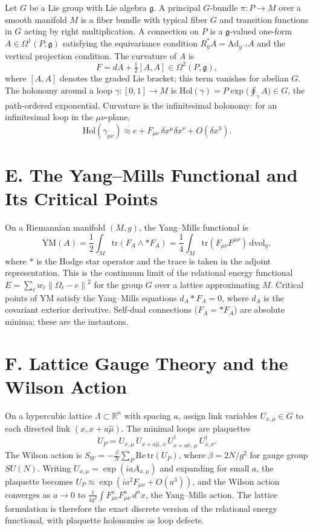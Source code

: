 \documentclass[12pt,a4paper,openany]{book}
\theoremstyle{plain}
\theoremstyle{definition}
\theoremstyle{remark}
\newcommand{\Energy}{E}
\newcommand{\norm}[1]{\left\|#1\right\|}
\begin{document}
Let $G$ be a Lie group with Lie algebra $\mathfrak{g}$. A principal $G$-bundle $\pi : P \to M$ over a smooth manifold $M$ is a fiber bundle with typical fiber $G$ and transition functions in $G$ acting by right multiplication. A connection on $P$ is a $\mathfrak{g}$-valued one-form $A \in \Omega^1(P, \mathfrak{g})$ satisfying the equivariance condition $R_g^* A = \mathrm{Ad}_{g^{-1}} A$ and the vertical projection condition. The curvature of $A$ is
\[
F = dA + \tfrac{1}{2}[A, A] \in \Omega^2(P, \mathfrak{g}),
\]
where $[A, A]$ denotes the graded Lie bracket; this term vanishes for abelian $G$. The holonomy around a loop $\gamma : [0,1] \to M$ is $\mathrm{Hol}(\gamma) = P\exp\!\bigl(\oint_\gamma A\bigr) \in G$, the path-ordered exponential. Curvature is the infinitesimal holonomy: for an infinitesimal loop in the $\mu\nu$-plane,
\[
\mathrm{Hol}(\gamma_{\mu\nu}) \approx e + F_{\mu\nu} \, \delta x^\mu \delta x^\nu + O(\delta x^3).
\]

\section*{E. The Yang--Mills Functional and Its Critical Points}

On a Riemannian manifold $(M, g)$, the Yang--Mills functional is
\[
\mathrm{YM}(A) = \frac{1}{2} \int_M \mathrm{tr}(F_A \wedge {*} F_A) = \frac{1}{4} \int_M \mathrm{tr}(F_{\mu\nu} F^{\mu\nu}) \, \mathrm{dvol}_g,
\]
where ${*}$ is the Hodge star operator and the trace is taken in the adjoint representation. This is the continuum limit of the relational energy functional $\Energy = \sum_\ell w_\ell \norm{\Omega_\ell - e}^2$ for the group $G$ over a lattice approximating $M$. Critical points of $\mathrm{YM}$ satisfy the Yang--Mills equations $d_A {*} F_A = 0$, where $d_A$ is the covariant exterior derivative. Self-dual connections ($F_A = {*} F_A$) are absolute minima; these are the instantons.

\section*{F. Lattice Gauge Theory and the Wilson Action}

On a hypercubic lattice $\Lambda \subset \mathbb{R}^n$ with spacing $a$, assign link variables $U_{x,\mu} \in G$ to each directed link $(x, x + a\hat\mu)$. The minimal loops are plaquettes
\[
U_P = U_{x,\mu} \, U_{x + a\hat\mu,\, \nu} \, U_{x + a\hat\nu,\, \mu}^\dagger \, U_{x,\nu}^\dagger.
\]
The Wilson action \cite{WilsonLattice1974} is $S_W = -\frac{\beta}{N} \sum_P \mathrm{Re}\, \mathrm{tr}(U_P)$, where $\beta = 2N/g^2$ for gauge group $SU(N)$. Writing $U_{x,\mu} = \exp(i a A_{x,\mu})$ and expanding for small $a$, the plaquette becomes $U_P \approx \exp(i a^2 F_{\mu\nu} + O(a^3))$, and the Wilson action converges as $a \to 0$ to $\frac{1}{4g^2} \int F_{\mu\nu}^a F_{\mu\nu}^a \, d^n x$, the Yang--Mills action. The lattice formulation is therefore the exact discrete version of the relational energy functional, with plaquette holonomies as loop defects.
\end{document}
